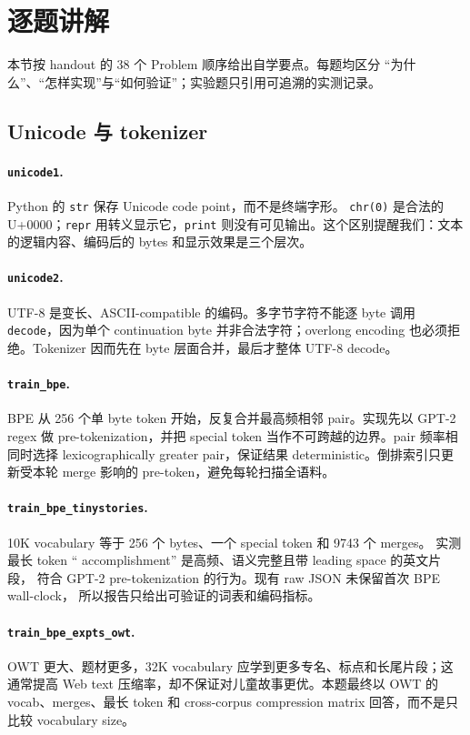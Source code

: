 \section{逐题讲解}
\label{sec:walkthrough}
本节按 handout 的 38 个 Problem 顺序给出自学要点。每题均区分
``为什么''、``怎样实现''与``如何验证''；实验题只引用可追溯的实测记录。

\subsection{Unicode 与 tokenizer}
\paragraph{\texttt{unicode1}.}
Python 的 \texttt{str} 保存 Unicode code point，而不是终端字形。
\texttt{chr(0)} 是合法的 U+0000；\texttt{repr} 用转义显示它，\texttt{print}
则没有可见输出。这个区别提醒我们：文本的逻辑内容、编码后的 bytes 和显示效果是三个层次。

\paragraph{\texttt{unicode2}.}
UTF-8 是变长、ASCII-compatible 的编码。多字节字符不能逐 byte 调用
\texttt{decode}，因为单个 continuation byte 并非合法字符；overlong encoding
也必须拒绝。Tokenizer 因而先在 byte 层面合并，最后才整体 UTF-8 decode。

\paragraph{\texttt{train\_bpe}.}
BPE 从 256 个单 byte token 开始，反复合并最高频相邻 pair。实现先以 GPT-2 regex
做 pre-tokenization，并把 special token 当作不可跨越的边界。pair 频率相同时选择
lexicographically greater pair，保证结果 deterministic。倒排索引只更新受本轮 merge
影响的 pre-token，避免每轮扫描全语料。

\paragraph{\texttt{train\_bpe\_tinystories}.}
10K vocabulary 等于 256 个 bytes、一个 special token 和 9743 个 merges。
实测最长 token `` accomplishment'' 是高频、语义完整且带 leading space 的英文片段，
符合 GPT-2 pre-tokenization 的行为。现有 raw JSON 未保留首次 BPE wall-clock，
所以报告只给出可验证的词表和编码指标。

\paragraph{\texttt{train\_bpe\_expts\_owt}.}
OWT 更大、题材更多，32K vocabulary 应学到更多专名、标点和长尾片段；这通常提高
Web text 压缩率，却不保证对儿童故事更优。本题最终以 OWT 的 vocab、merges、最长 token
和 cross-corpus compression matrix 回答，而不是只比较 vocabulary size。

